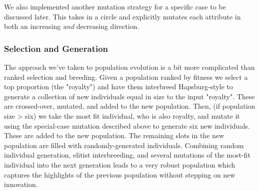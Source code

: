 \documentclass[12pt]{article}
\begin{document}
We also implemented another mutation strategy for a specific case to be discussed later. This takes in a circle and explicitly mutates each attribute in both an increasing \textit{and} decreasing direction.

\subsubsection{Selection and Generation}
The approach we've taken to population evolution is a bit more complicated than ranked selection and breeding. Given a population ranked by fitness we select a top proportion (the "royalty") and have them interbreed Hapsburg-style to generate a collection of new individuals equal in size to the input "royalty". These are crossed-over, mutated, and added to the new population. Then, (if population size > six) we take the most fit individual, who is also royalty, and mutate it using the special-case mutation described above to generate six new individuals. These are added to the new population. The remaining slots in the new population are filled with randomly-generated individuals. Combining random individual generation, elitist interbreeding, and several mutations of the most-fit individual into the next generation leads to a very robust population which captures the highlights of the previous population without stepping on new innovation.  
\end{document}
